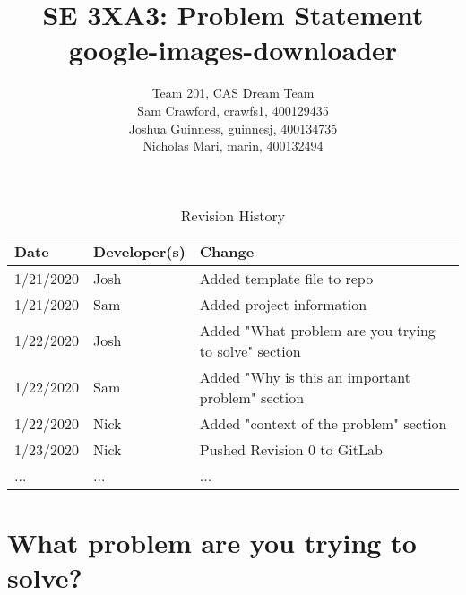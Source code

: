 \documentclass{article}
\title{SE 3XA3: Problem Statement\\google-images-downloader}
\author{Team 201, CAS Dream Team
		\\ Sam Crawford, crawfs1, 400129435
		\\ Joshua Guinness, guinnesj, 400134735
		\\ Nicholas Mari, marin, 400132494
}
\date{}
\begin{document}
\begin{table}[h]
\caption{Revision History} \label{TblRevisionHistory}
\begin{tabularx}{\textwidth}{llX}
\toprule
\textbf{Date} & \textbf{Developer(s)} & \textbf{Change}\\
\midrule
1/21/2020 & Josh & Added template file to repo\\
1/21/2020 & Sam & Added project information\\
1/22/2020 & Josh & Added "What problem are you trying to solve" section\\
1/22/2020 & Sam & Added "Why is this an important problem" section\\
1/22/2020 & Nick & Added "context of the problem" section\\
1/23/2020 & Nick & Pushed Revision 0 to GitLab\\
... & ... & ...\\
\bottomrule
\end{tabularx}
\end{table}

\newpage

\maketitle

\section* {What problem are you trying to solve?}
\end{document}
